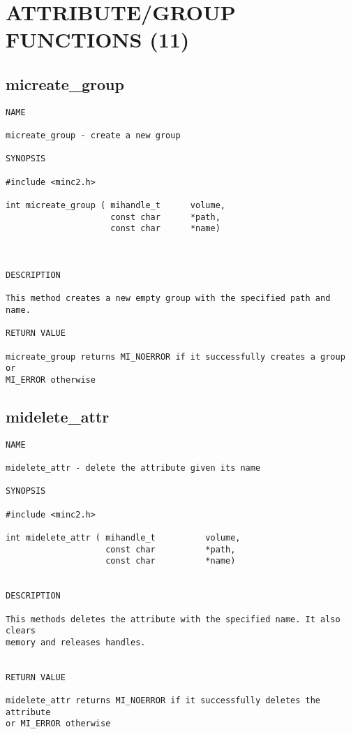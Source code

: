 \documentclass{article}
\begin{document}
\section{ATTRIBUTE/GROUP FUNCTIONS (11)}
\subsection{micreate\_group}

\begin{verbatim}
NAME 

micreate_group - create a new group

SYNOPSIS

#include <minc2.h>

int micreate_group ( mihandle_t      volume,
                     const char      *path,
                     const char      *name)
                    
                       
                                
DESCRIPTION

This method creates a new empty group with the specified path and name.

RETURN VALUE

micreate_group returns MI_NOERROR if it successfully creates a group or 
MI_ERROR otherwise

\end{verbatim}

\subsection{midelete\_attr}

\begin{verbatim}
NAME 

midelete_attr - delete the attribute given its name

SYNOPSIS

#include <minc2.h>

int midelete_attr ( mihandle_t          volume,
                    const char          *path,
                    const char          *name)
                       
                                
DESCRIPTION

This methods deletes the attribute with the specified name. It also clears 
memory and releases handles.


RETURN VALUE

midelete_attr returns MI_NOERROR if it successfully deletes the attribute
or MI_ERROR otherwise

\end{verbatim}
\end{document}

